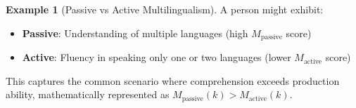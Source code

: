 \documentclass[12pt,a4paper]{article}
\theoremstyle{definition}
\newtheorem{example}{Example}
\begin{document}
\begin{example}[Passive vs Active Multilingualism]
A person might exhibit:
\begin{itemize}
    \item \textbf{Passive}: Understanding of multiple languages (high $M_{\text{passive}}$ score)
    \item \textbf{Active}: Fluency in speaking only one or two languages (lower $M_{\text{active}}$ score)
\end{itemize}
This captures the common scenario where comprehension exceeds production ability, mathematically represented as $M_{\text{passive}}(k) > M_{\text{active}}(k)$.
\end{example}
\end{document}
